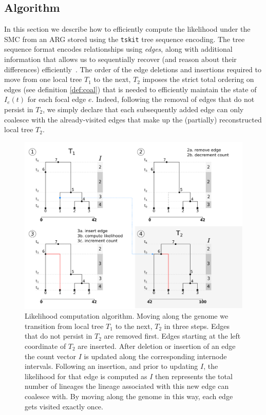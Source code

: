\documentclass{article}
\begin{document}
\subsection*{Algorithm} \label{par:algo}
In this section we describe how to efficiently compute the likelihood under the SMC
from an ARG stored using the \texttt{tskit} tree sequence encoding. 
The tree sequence format encodes relationships using \emph{edges},
along with additional information that
allows us to sequentially recover (and reason about 
their differences) 
efficiently~\citep{kelleher_efficient_2016, ralph_efficiently_2020}.
The order of the edge deletions and insertions required to move from one local tree $T_1$ to
the next, $T_2$ imposes the strict total ordering on edges
(see definition \eqref{def:coal})
that is needed to efficiently maintain the state of $I_e(t)$ for each focal edge $e$.
Indeed, following the removal of edges that do not persist in $T_2$,
we simply declare that each subsequently added edge
can only coalesce with the already-visited edges 
that make up the (partially) reconstructed local tree $T_2$.

\begin{figure}[!ht]
\centering
\includegraphics[width=\textwidth]{figures/ts_algo_2rows.png}
\caption{Likelihood computation algorithm. 
Moving along the genome we transition from
local tree $T_1$ to the next, $T_2$ in three steps. 
Edges that do not persist in $T_2$ are
removed first. Edges starting at the left coordinate of $T_2$ are inserted.
After deletion or insertion of an edge the count vector $I$ is updated along the
corresponding internode intervals. Following an insertion, and prior to updating $I$,
the likelihood for that edge is computed as $I$ then represents the total number of
lineages the lineage associated with this new edge can
coalesce with. By moving along the genome in this way, each edge gets visited exactly once.}
\label{fig:algo}
\end{figure}
\end{document}
